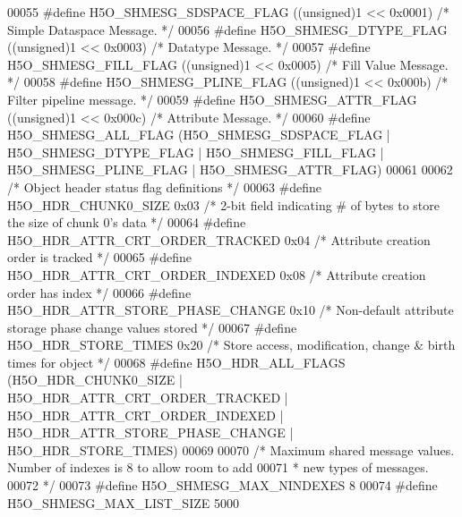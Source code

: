 \begin{DoxyCode}
00055 \textcolor{preprocessor}{#define H5O\_SHMESG\_SDSPACE\_FLAG ((unsigned)1 << 0x0001) }\textcolor{comment}{/* Simple Dataspace Message.  */}\textcolor{preprocessor}{}
00056 \textcolor{preprocessor}{#define H5O\_SHMESG\_DTYPE\_FLAG   ((unsigned)1 << 0x0003) }\textcolor{comment}{/* Datatype Message.  */}\textcolor{preprocessor}{}
00057 \textcolor{preprocessor}{#define H5O\_SHMESG\_FILL\_FLAG    ((unsigned)1 << 0x0005) }\textcolor{comment}{/* Fill Value Message. */}\textcolor{preprocessor}{}
00058 \textcolor{preprocessor}{#define H5O\_SHMESG\_PLINE\_FLAG   ((unsigned)1 << 0x000b) }\textcolor{comment}{/* Filter pipeline message.  */}\textcolor{preprocessor}{}
00059 \textcolor{preprocessor}{#define H5O\_SHMESG\_ATTR\_FLAG    ((unsigned)1 << 0x000c) }\textcolor{comment}{/* Attribute Message.  */}\textcolor{preprocessor}{}
00060 \textcolor{preprocessor}{#define H5O\_SHMESG\_ALL\_FLAG     (H5O\_SHMESG\_SDSPACE\_FLAG | H5O\_SHMESG\_DTYPE\_FLAG | H5O\_SHMESG\_FILL\_FLAG |
       H5O\_SHMESG\_PLINE\_FLAG | H5O\_SHMESG\_ATTR\_FLAG)}
00061 
00062 \textcolor{comment}{/* Object header status flag definitions */}
00063 \textcolor{preprocessor}{#define H5O\_HDR\_CHUNK0\_SIZE             0x03    }\textcolor{comment}{/* 2-bit field indicating # of bytes to store the size of
       chunk 0's data */}\textcolor{preprocessor}{}
00064 \textcolor{preprocessor}{#define H5O\_HDR\_ATTR\_CRT\_ORDER\_TRACKED  0x04    }\textcolor{comment}{/* Attribute creation order is tracked */}\textcolor{preprocessor}{}
00065 \textcolor{preprocessor}{#define H5O\_HDR\_ATTR\_CRT\_ORDER\_INDEXED  0x08    }\textcolor{comment}{/* Attribute creation order has index */}\textcolor{preprocessor}{}
00066 \textcolor{preprocessor}{#define H5O\_HDR\_ATTR\_STORE\_PHASE\_CHANGE 0x10    }\textcolor{comment}{/* Non-default attribute storage phase change values stored
       */}\textcolor{preprocessor}{}
00067 \textcolor{preprocessor}{#define H5O\_HDR\_STORE\_TIMES             0x20    }\textcolor{comment}{/* Store access, modification, change & birth times for
       object */}\textcolor{preprocessor}{}
00068 \textcolor{preprocessor}{#define H5O\_HDR\_ALL\_FLAGS       (H5O\_HDR\_CHUNK0\_SIZE | H5O\_HDR\_ATTR\_CRT\_ORDER\_TRACKED |
       H5O\_HDR\_ATTR\_CRT\_ORDER\_INDEXED | H5O\_HDR\_ATTR\_STORE\_PHASE\_CHANGE | H5O\_HDR\_STORE\_TIMES)}
00069 
00070 \textcolor{comment}{/* Maximum shared message values.  Number of indexes is 8 to allow room to add}
00071 \textcolor{comment}{ * new types of messages.}
00072 \textcolor{comment}{ */}
00073 \textcolor{preprocessor}{#define H5O\_SHMESG\_MAX\_NINDEXES 8}
00074 \textcolor{preprocessor}{#define H5O\_SHMESG\_MAX\_LIST\_SIZE 5000}

\end{DoxyCode}

